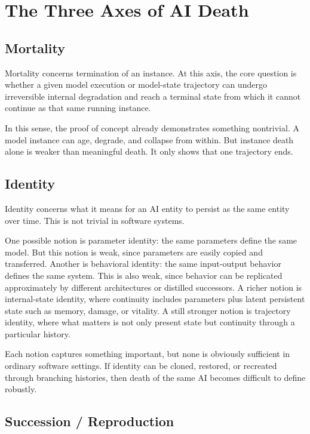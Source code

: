 \documentclass[11pt]{article}
\begin{document}
\newpage
\section{The Three Axes of AI Death}

\subsection{Mortality}

Mortality concerns termination of an instance. At this axis, the core question is whether a given model execution or model-state trajectory can undergo irreversible internal degradation and reach a terminal state from which it cannot continue as that same running instance.

In this sense, the proof of concept already demonstrates something nontrivial. A model instance can age, degrade, and collapse from within. But instance death alone is weaker than meaningful death. It only shows that one trajectory ends.

\subsection{Identity}

Identity concerns what it means for an AI entity to persist as the same entity over time. This is not trivial in software systems.

One possible notion is parameter identity: the same parameters define the same model. But this notion is weak, since parameters are easily copied and transferred. Another is behavioral identity: the same input-output behavior defines the same system. This is also weak, since behavior can be replicated approximately by different architectures or distilled successors. A richer notion is internal-state identity, where continuity includes parameters plus latent persistent state such as memory, damage, or vitality. A still stronger notion is trajectory identity, where what matters is not only present state but continuity through a particular history.

Each notion captures something important, but none is obviously sufficient in ordinary software settings. If identity can be cloned, restored, or recreated through branching histories, then death of the same AI becomes difficult to define robustly.

\subsection{Succession / Reproduction}
\end{document}
